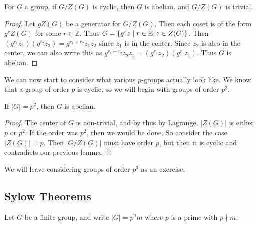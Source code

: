 \documentclass[a4paper]{scrartcl}
\begin{document}
\begin{lemma}
	For $G$ a group, if $G/Z(G)$ is cyclic, then $G$ is abelian, and $G/Z(G)$ is trivial.
\end{lemma}
\begin{proof}
	Let $gZ(G)$ be a generator for $G/Z(G)$. Then each coset is of the form $g^r Z(G)$ for some $r \in \mathbb{Z}$. Thus $G = \{g^r z \mid r \in \mathbb{Z}, z \in Z(G) \}$.
	Then $(g^{r_1} z_1)(g^{r_2}z_2) = g^{r_1 + r_2} z_1 z_2$ since $z_1$ is in the center.
	Since $z_2$ is also in the center, we can also write this as $g^{r_1 + r_2}z_2 z_1 =  (g^{r_2} z_2)(g^{r_1} z_1)$. Thus $G$ is abelian.
\end{proof}

We can now start to consider what various $p$-groups actually look like. We know that a group of order $p$ is cyclic, so we will begin with groups of order $p^2$.

\begin{corollary}
	If $|G| = p^2$, then $G$ is abelian.
\end{corollary}
\begin{proof}
	The center of $G$ is non-trivial, and by thus by Lagrange, $|Z(G)|$ is either $p$ or $p^2$. If the order was $p^2$, then we would be done. So consider the case $|Z(G)| = p$. Then $|G/Z(G)|$ must have order $p$, but then it is cyclic and contradicts our previous lemma.
\end{proof}

We will leave considering groups of order $p^3$ as an exercise.

\subsection{Sylow Theorems}

Let $G$ be a finite group, and write $|G| = p^a m$ where $p$ is a prime with $p \nmid m$.
\end{document}
